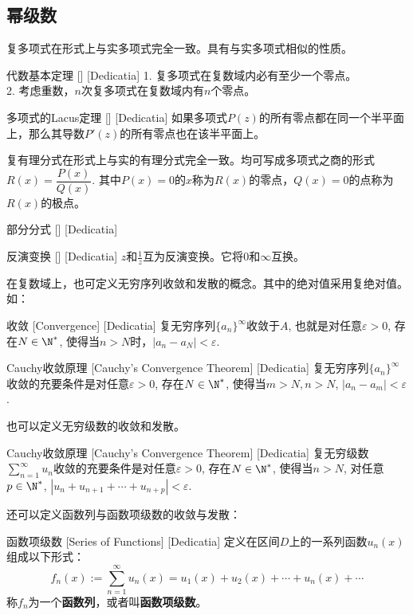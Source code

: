 \documentclass[UTF8]{ctexart}
\begin{document}
\subsection{幂级数}
复多项式在形式上与实多项式完全一致。具有与实多项式相似的性质。
\begin{thm}
    [UUID]
    {代数基本定理}
    []
    [Dedicatia]
    1. 复多项式在复数域内必有至少一个零点。\\
    2. 考虑重数，$n$次复多项式在复数域内有$n$个零点。
\end{thm}
\begin{thm}
    [UUID]
    {多项式的Lacus定理}
    []
    [Dedicatia]
    如果多项式$P(z)$的所有零点都在同一个半平面上，那么其导数$P'(z)$的所有零点也在该半平面上。
\end{thm}
复有理分式在形式上与实的有理分式完全一致。均可写成多项式之商的形式$R(x)=\dfrac{P(x)}{Q(x)}$. 其中$P(x)=0$的$x$称为$R(x)$的零点，$Q(x)=0$的点称为$R(x)$的极点。
\begin{dfn}
    [UUID]
    {部分分式}
    []
    [Dedicatia]
\end{dfn}
\begin{dfn}
    [UUID]
    {反演变换}
    []
    [Dedicatia]
    $z$和$\frac{1}{z}$互为反演变换。它将$0$和$\infty$互换。
\end{dfn}
在复数域上，也可定义无穷序列收敛和发散的概念。其中的绝对值采用复绝对值。如：
\begin{dfn}
    [UUID]
    {收敛}
    [Convergence]
    [Dedicatia]
    复无穷序列$\{a_n\}^\infty$收敛于$A$, 也就是对任意$\varepsilon>0$, 存在$N\in\N^*$, 使得当$n>N$时，$|a_n-a_N|<\varepsilon$.
\end{dfn}
\begin{thm}
    [UUID]
    {Cauchy收敛原理}
    [Cauchy's Convergence Theorem]
    [Dedicatia]
    复无穷序列$\{a_n\}^\infty$收敛的充要条件是对任意$\varepsilon>0$, 存在$N\in\N^*$, 使得当$m>N, n>N$, $|a_n-a_m|<\varepsilon$.
\end{thm}
也可以定义无穷级数的收敛和发散。
\begin{thm}
    [UUID]
    {Cauchy收敛原理}
    [Cauchy's Convergence Theorem]
    [Dedicatia]
    复无穷级数$\sum_{n = 1}^{\infty} u_n$收敛的充要条件是对任意$\varepsilon>0$, 存在$N\in\N^*$, 使得当$n>N$, 对任意$p\in\N^*$, $|u_n+u_{n+1}+\cdots+u_{n+p}|<\varepsilon$.
\end{thm}
还可以定义函数列与函数项级数的收敛与发散：
\begin{dfn}
    [UUID]
    {函数项级数}
    [Series of Functions]
    [Dedicatia]
    定义在区间$D$上的一系列函数$u_n(x)$组成以下形式：\[f_n(x):=\sum_{n = 1}^{\infty} u_n(x)=u_1(x)+u_2(x)+\cdots+u_n(x)+\cdots \]
    称$f_n$为一个\textbf{函数列}，或者叫\textbf{函数项级数}。
\end{dfn}
\end{document}
